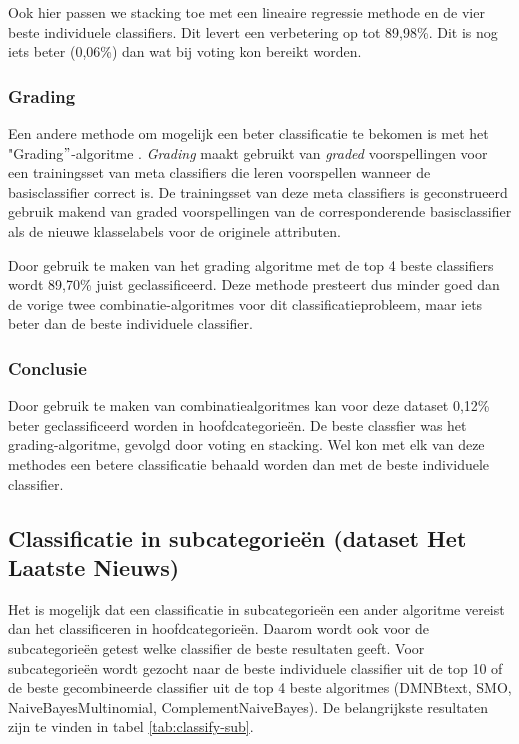 Ook hier passen we stacking toe met een lineaire regressie methode en de vier beste individuele classifiers. Dit levert een verbetering op tot 89,98\%. Dit is nog iets beter (0,06\%) dan wat bij voting kon bereikt worden. 

\subsubsection{Grading}\label{grading}
Een andere methode om mogelijk een beter classificatie te bekomen is met het "Grading$"$-algoritme \cite{SEEWALD}. \textit{Grading} maakt gebruikt van \textit{graded} voorspellingen voor een trainingsset van meta classifiers die leren voorspellen wanneer de basisclassifier correct is. De trainingsset van deze meta classifiers is geconstrueerd gebruik makend van graded voorspellingen van de corresponderende basisclassifier als de nieuwe klasselabels voor de originele attributen. 

Door gebruik te maken van het grading algoritme met de top 4 beste classifiers wordt 89,70\% juist geclassificeerd. Deze methode presteert dus minder goed dan de vorige twee combinatie-algoritmes voor dit classificatieprobleem, maar iets beter dan de beste individuele classifier.

\subsubsection{Conclusie}
Door gebruik te maken van combinatiealgoritmes kan voor deze dataset 0,12\% beter geclassificeerd worden in hoofdcategorie\"en. De beste classfier was het grading-algoritme, gevolgd door voting en stacking. Wel kon met elk van deze methodes een betere classificatie behaald worden dan met de beste individuele classifier.

\subsection{Classificatie in subcategorie\"en (dataset Het Laatste Nieuws)}
Het is mogelijk dat een classificatie in subcategorie\"en een ander algoritme vereist dan het classificeren in hoofdcategorie\"en. Daarom wordt ook voor de subcategorie\"en getest welke classifier de beste resultaten geeft. Voor subcategorie\"en wordt gezocht naar de beste individuele classifier uit de top 10 of de beste gecombineerde classifier uit de top 4 beste algoritmes (DMNBtext, SMO, NaiveBayesMultinomial, ComplementNaiveBayes). De belangrijkste resultaten zijn te vinden in tabel \ref{tab:classify-sub}.

